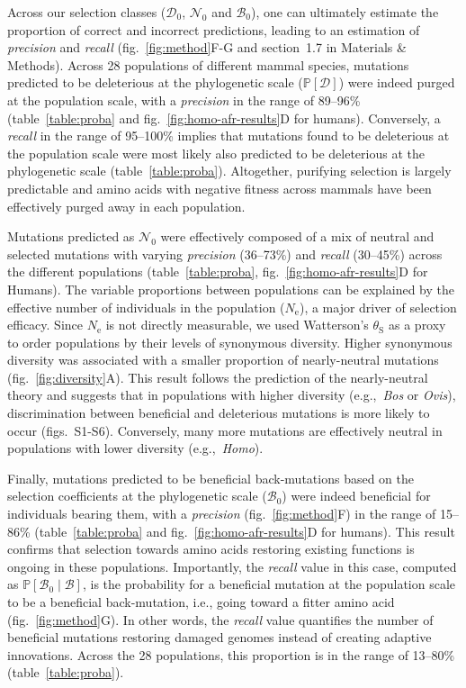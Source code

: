 \documentclass[12pt]{article}
\newcommand{\Ne}{N_{\text{e}}}
\newcommand{\proba}{\mathbb{P}}
\newcommand{\SphyDel}{\mathcal{D}_0}
\newcommand{\SphyNeu}{\mathcal{N}_0}
\newcommand{\SphyBen}{\mathcal{B}_0}
\newcommand{\given}{\mid}
\newcommand{\SpopDel}{\mathcal{D}}
\newcommand{\SpopBen}{\mathcal{B}}
\newcommand{\ProbaPopDel}{\proba [ \SpopDel]}
\newcommand{\thetaSyn}{\theta_{\text{S}}}
\begin{document}
Across our selection classes ($\SphyDel$, $\SphyNeu$ and $\SphyBen$), one can ultimately estimate the proportion of correct and incorrect predictions, leading to an estimation of \textit{precision} and \textit{recall} (fig.~\ref{fig:method}F-G and section~1.7 in Materials \& Methods).
Across 28 populations of different mammal species, mutations predicted to be deleterious at the phylogenetic scale ($\ProbaPopDel$) were indeed purged at the population scale, with a \textit{precision} in the range of 89--96\% (table~\ref{table:proba} and fig.~\ref{fig:homo-afr-results}D for humans).
Conversely, a \textit{recall} in the range of 95--100\% implies that mutations found to be deleterious at the population scale were most likely also predicted to be deleterious at the phylogenetic scale (table~\ref{table:proba}).
Altogether, purifying selection is largely predictable and amino acids with negative fitness across mammals have been effectively purged away in each population.

Mutations predicted as $\SphyNeu$ were effectively composed of a mix of neutral and selected mutations with varying \textit{precision} (36--73\%) and \textit{recall} (30--45\%) across the different populations (table~\ref{table:proba}, fig.~\ref{fig:homo-afr-results}D for Humans).
The variable proportions between populations can be explained by the effective number of individuals in the population ($\Ne$), a major driver of selection efficacy.
Since $\Ne$ is not directly measurable, we used Watterson's $\thetaSyn$ as a proxy to order populations by their levels of synonymous diversity.
Higher synonymous diversity was associated with a smaller proportion of nearly-neutral mutations (fig.~\ref{fig:diversity}A).
This result follows the prediction of the nearly-neutral theory and suggests that in populations with higher diversity (e.g.,~\textit{Bos} or \textit{Ovis}), discrimination between beneficial and deleterious mutations is more likely to occur (figs.~S1-S6).
Conversely, many more mutations are effectively neutral in populations with lower diversity (e.g.,~\textit{Homo}).

Finally, mutations predicted to be beneficial back-mutations based on the selection coefficients at the phylogenetic scale ($\SphyBen$) were indeed beneficial for individuals bearing them, with a \textit{precision} (fig.~\ref{fig:method}F) in the range of 15--86\% (table~\ref{table:proba} and fig.~\ref{fig:homo-afr-results}D for humans).
This result confirms that selection towards amino acids restoring existing functions is ongoing in these populations.
Importantly, the \textit{recall} value in this case, computed as $\proba [ \SphyBen  \given  \SpopBen]$, is the probability for a beneficial mutation at the population scale to be a beneficial back-mutation, i.e., going toward a fitter amino acid (fig.~\ref{fig:method}G).
In other words, the \textit{recall} value quantifies the number of beneficial mutations restoring damaged genomes instead of creating adaptive innovations.
Across the 28 populations, this proportion is in the range of 13--80\% (table~\ref{table:proba}).
\end{document}
